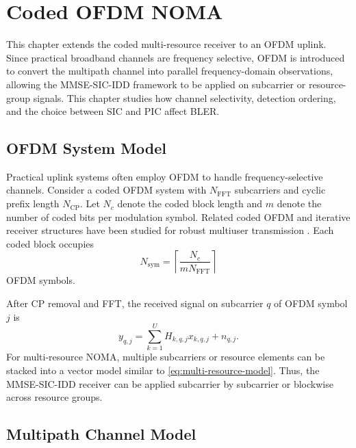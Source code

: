 \chapter{Coded OFDM NOMA}\label{ch:ofdm}

This chapter extends the coded multi-resource receiver to an OFDM uplink. Since practical broadband channels are frequency selective, OFDM is introduced to convert the multipath channel into parallel frequency-domain observations, allowing the MMSE-SIC-IDD framework to be applied on subcarrier or resource-group signals. This chapter studies how channel selectivity, detection ordering, and the choice between SIC and PIC affect BLER.

\section{OFDM System Model}

Practical uplink systems often employ OFDM to handle frequency-selective channels. Consider a coded OFDM system with $N_{\mathrm{FFT}}$ subcarriers and cyclic prefix length $N_{\mathrm{CP}}$. Let $N_c$ denote the coded block length and $m$ denote the number of coded bits per modulation symbol. Related coded OFDM and iterative receiver structures have been studied for robust multiuser transmission \cite{sahin2024rsma,lin2024slotted}. Each coded block occupies
\begin{equation}
    N_{\mathrm{sym}}
    =
    \left\lceil \frac{N_c}{mN_{\mathrm{FFT}}}\right\rceil
\end{equation}
OFDM symbols.

After CP removal and FFT, the received signal on subcarrier $q$ of OFDM symbol $j$ is
\begin{equation}
    y_{q,j}
    =
    \sum_{k=1}^{U} H_{k,q,j}x_{k,q,j}+n_{q,j}.
    \label{eq:ofdm-subcarrier-model}
\end{equation}
For multi-resource NOMA, multiple subcarriers or resource elements can be stacked into a vector model similar to \eqref{eq:multi-resource-model}. Thus, the MMSE-SIC-IDD receiver can be applied subcarrier by subcarrier or blockwise across resource groups.


\section{Multipath Channel Model}

